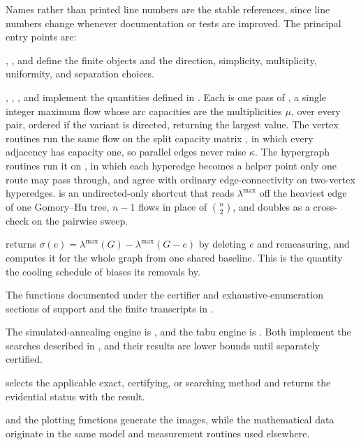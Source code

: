 Names rather than printed line numbers are the stable references, since line numbers change whenever documentation or tests are improved. The principal entry points are:

\begin{description}[style=nextline]
  \item[Graph and hypergraph objects]
  , , and  define the finite objects and the direction, simplicity, multiplicity, uniformity, and separation choices.

  \item[Exact measurement]
  , , , and  implement the quantities defined in . Each is one pass of , a single  integer maximum flow whose arc capacities are the multiplicities $\mu$, over every pair, ordered if the variant is directed, returning the largest value. The vertex routines run the same flow on the split capacity matrix , in which every adjacency has capacity one, so parallel edges never raise $\kappa$. The hypergraph routines run it on , in which each hyperedge becomes a helper point only one route may pass through, and agree with ordinary edge-connectivity on two-vertex hyperedges.  is an undirected-only shortcut that reads $\lambda^{\max}$ off the heaviest edge of one Gomory--Hu tree, $n-1$ flows in place of $\binom{n}{2}$, and doubles as a cross-check on the pairwise sweep.

  \item[Search instrumentation]
   returns $\sigma(e) = \lambda^{\max}(G) - \lambda^{\max}(G-e)$ by deleting $e$ and remeasuring, and  computes it for the whole graph from one shared baseline. This is the quantity the cooling schedule of  biases its removals by.

  \item[Certification and enumeration]
  The functions documented under the certifier and exhaustive-enumeration sections of  support  and the finite transcripts in .

  \item[Discovery]
  The simulated-annealing engine is , and the tabu engine is . Both implement the searches described in , and their results are lower bounds until separately certified.

  \item[Unified entry point]
   selects the applicable exact, certifying, or searching method and returns the evidential status with the result.

  \item[Presentation]
   and the plotting functions generate the images, while the mathematical data originate in the same model and measurement routines used elsewhere.
\end{description}

